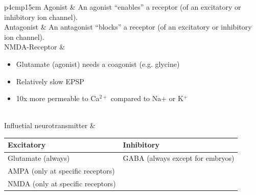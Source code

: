 \begin{longtable}{p{4cm}p{15cm}}
Agonist			& An agonist ``enables'' a receptor (of an excitatory or inhibitory ion channel).\\
Antagonist		& An antagonist ``blocks'' a receptor (of an excitatory or inhibitory ion channel).\\
NMDA-Receptor		& \begin{itemize}
             		  	\item Glutamate (agonist) needs a coagonist (e.g. glycine)
				\item Relatively slow EPSP
				\item 10x more permeable to Ca$^{2+}$ compared to Na$+$ or K$^+$
             		  \end{itemize}\\
Influetial neurotransmitter	& \begin{tabular}[t]{ll}
				    Excitatory			& Inhibitory\\\hline
				    Glutamate (always)		& GABA (always except for embryos)\\
				    AMPA (only at specific receptors)\\
				    NMDA (only at specific receptors)\\
				  \end{tabular}\\
\end{longtable}